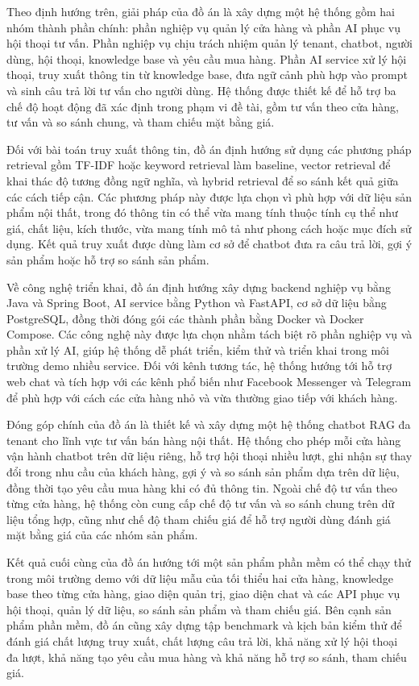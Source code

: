 \documentclass[../DoAn.tex]{subfiles}
\begin{document}
Theo định hướng trên, giải pháp của đồ án là xây dựng một hệ thống gồm hai nhóm thành phần chính: phần nghiệp vụ quản lý cửa hàng và phần AI phục vụ hội thoại tư vấn. Phần nghiệp vụ chịu trách nhiệm quản lý tenant, chatbot, người dùng, hội thoại, knowledge base và yêu cầu mua hàng. Phần AI service xử lý hội thoại, truy xuất thông tin từ knowledge base, đưa ngữ cảnh phù hợp vào prompt và sinh câu trả lời tư vấn cho người dùng. Hệ thống được thiết kế để hỗ trợ ba chế độ hoạt động đã xác định trong phạm vi đề tài, gồm tư vấn theo cửa hàng, tư vấn và so sánh chung, và tham chiếu mặt bằng giá.

Đối với bài toán truy xuất thông tin, đồ án định hướng sử dụng các phương pháp retrieval gồm TF-IDF hoặc keyword retrieval làm baseline, vector retrieval để khai thác độ tương đồng ngữ nghĩa, và hybrid retrieval để so sánh kết quả giữa các cách tiếp cận. Các phương pháp này được lựa chọn vì phù hợp với dữ liệu sản phẩm nội thất, trong đó thông tin có thể vừa mang tính thuộc tính cụ thể như giá, chất liệu, kích thước, vừa mang tính mô tả như phong cách hoặc mục đích sử dụng. Kết quả truy xuất được dùng làm cơ sở để chatbot đưa ra câu trả lời, gợi ý sản phẩm hoặc hỗ trợ so sánh sản phẩm.

Về công nghệ triển khai, đồ án định hướng xây dựng backend nghiệp vụ bằng Java và Spring Boot, AI service bằng Python và FastAPI, cơ sở dữ liệu bằng PostgreSQL, đồng thời đóng gói các thành phần bằng Docker và Docker Compose. Các công nghệ này được lựa chọn nhằm tách biệt rõ phần nghiệp vụ và phần xử lý AI, giúp hệ thống dễ phát triển, kiểm thử và triển khai trong môi trường demo nhiều service. Đối với kênh tương tác, hệ thống hướng tới hỗ trợ web chat và tích hợp với các kênh phổ biến như Facebook Messenger và Telegram để phù hợp với cách các cửa hàng nhỏ và vừa thường giao tiếp với khách hàng.

Đóng góp chính của đồ án là thiết kế và xây dựng một hệ thống chatbot RAG đa tenant cho lĩnh vực tư vấn bán hàng nội thất. Hệ thống cho phép mỗi cửa hàng vận hành chatbot trên dữ liệu riêng, hỗ trợ hội thoại nhiều lượt, ghi nhận sự thay đổi trong nhu cầu của khách hàng, gợi ý và so sánh sản phẩm dựa trên dữ liệu, đồng thời tạo yêu cầu mua hàng khi có đủ thông tin. Ngoài chế độ tư vấn theo từng cửa hàng, hệ thống còn cung cấp chế độ tư vấn và so sánh chung trên dữ liệu tổng hợp, cũng như chế độ tham chiếu giá để hỗ trợ người dùng đánh giá mặt bằng giá của các nhóm sản phẩm.

Kết quả cuối cùng của đồ án hướng tới một sản phẩm phần mềm có thể chạy thử trong môi trường demo với dữ liệu mẫu của tối thiểu hai cửa hàng, knowledge base theo từng cửa hàng, giao diện quản trị, giao diện chat và các API phục vụ hội thoại, quản lý dữ liệu, so sánh sản phẩm và tham chiếu giá. Bên cạnh sản phẩm phần mềm, đồ án cũng xây dựng tập benchmark và kịch bản kiểm thử để đánh giá chất lượng truy xuất, chất lượng câu trả lời, khả năng xử lý hội thoại đa lượt, khả năng tạo yêu cầu mua hàng và khả năng hỗ trợ so sánh, tham chiếu giá.
\end{document}
